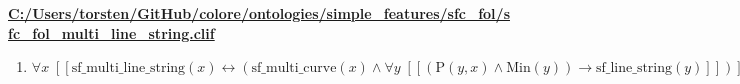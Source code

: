 \documentclass{article}
\begin{document}
\textbf{\url{C:/Users/torsten/GitHub/colore/ontologies/simple\_features/sfc\_fol/sfc\_fol\_multi\_line\_string.clif}}

\begin{enumerate}
\item $\forall x\;  \left[ \left[ \textrm{sf\_multi\_line\_string}(x) \leftrightarrow \left(\textrm{sf\_multi\_curve}(x) \land \forall y\;  \left[ \left[ \left(\textrm{P}(y,x) \land \textrm{Min}(y)\right) \rightarrow \textrm{sf\_line\_string}(y) \right] \right]\right) \right] \right]$
\end{enumerate}
\end{document}
